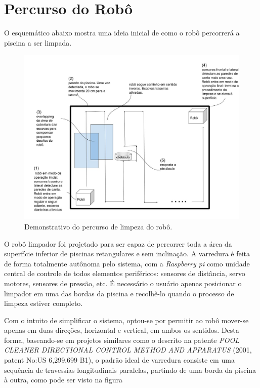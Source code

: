 \section{Percurso do Robô}
O esquemático abaixo mostra uma ideia inicial de como o robô percorrerá a piscina
a ser limpada.
\par
\begin{figure}[h]
    \centering
    \includegraphics[width=\textwidth]{figures/schema-way-robot.jpg}
    \caption{Demonstrativo do percurso de limpeza do robô.}
    \label{fig:schema-way-robot}
  \end{figure}
\par
O robô limpador foi projetado para ser capaz de percorrer toda a área da superfície
inferior de piscinas retangulares e sem inclinação. A varredura é feita de forma
totalmente autônoma pelo sistema, com a \textit{Raspberry pi} como unidade central de
controle de todos elementos periféricos: sensores de distância, servo motores,
sensores de pressão, etc. É necessário o usuário apenas posicionar o limpador em
uma das bordas da piscina e recolhê-lo quando o processo de limpeza estiver completo.
\par
Com o intuito de simplificar o sistema, optou-se por permitir ao robô mover-se apenas
em duas direções, horizontal e vertical, em ambos os sentidos. Desta forma,
baseando-se em projetos similares como o descrito na patente \textit{POOL CLEANER
DIRECTIONAL CONTROL METHOD AND APPARATUS} (2001, patent No:US 6,299,699 B1), o
padrão ideal de varredura consiste em uma sequência de travessias longitudinais
paralelas, partindo de uma borda da piscina à outra, como pode ser visto na figura
